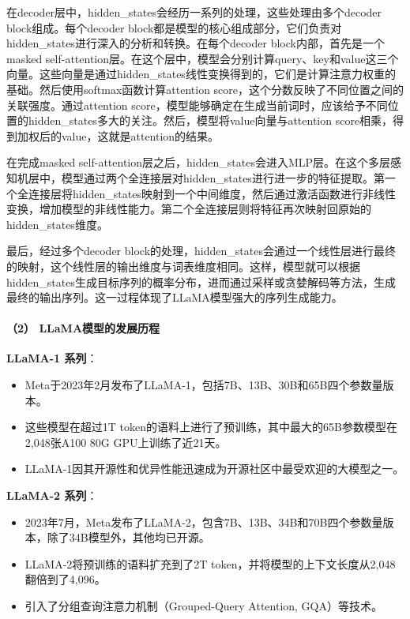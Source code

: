 \documentclass[12pt,a4paper]{book}
\begin{document}
在decoder层中，hidden\_states会经历一系列的处理，这些处理由多个decoder
block组成。每个decoder
block都是模型的核心组成部分，它们负责对hidden\_states进行深入的分析和转换。在每个decoder
block内部，首先是一个masked
self-attention层。在这个层中，模型会分别计算query、key和value这三个向量。这些向量是通过hidden\_states线性变换得到的，它们是计算注意力权重的基础。然后使用softmax函数计算attention
score，这个分数反映了不同位置之间的关联强度。通过attention
score，模型能够确定在生成当前词时，应该给予不同位置的hidden\_states多大的关注。然后，模型将value向量与attention
score相乘，得到加权后的value，这就是attention的结果。

在完成masked
self-attention层之后，hidden\_states会进入MLP层。在这个多层感知机层中，模型通过两个全连接层对hidden\_states进行进一步的特征提取。第一个全连接层将hidden\_states映射到一个中间维度，然后通过激活函数进行非线性变换，增加模型的非线性能力。第二个全连接层则将特征再次映射回原始的hidden\_states维度。

最后，经过多个decoder
block的处理，hidden\_states会通过一个线性层进行最终的映射，这个线性层的输出维度与词表维度相同。这样，模型就可以根据hidden\_states生成目标序列的概率分布，进而通过采样或贪婪解码等方法，生成最终的输出序列。这一过程体现了LLaMA模型强大的序列生成能力。

\paragraph{（2）
LLaMA模型的发展历程}\label{llamaux6a21ux578bux7684ux53d1ux5c55ux5386ux7a0b}

\textbf{LLaMA-1 系列}：

\begin{itemize}
\tightlist
\item
  Meta于2023年2月发布了LLaMA-1，包括7B、13B、30B和65B四个参数量版本。
\item
  这些模型在超过1T
  token的语料上进行了预训练，其中最大的65B参数模型在2,048张A100 80G
  GPU上训练了近21天。
\item
  LLaMA-1因其开源性和优异性能迅速成为开源社区中最受欢迎的大模型之一。
\end{itemize}

\textbf{LLaMA-2 系列}：

\begin{itemize}
\tightlist
\item
  2023年7月，Meta发布了LLaMA-2，包含7B、13B、34B和70B四个参数量版本，除了34B模型外，其他均已开源。
\item
  LLaMA-2将预训练的语料扩充到了2T
  token，并将模型的上下文长度从2,048翻倍到了4,096。
\item
  引入了分组查询注意力机制（Grouped-Query Attention, GQA）等技术。
\end{itemize}
\end{document}
